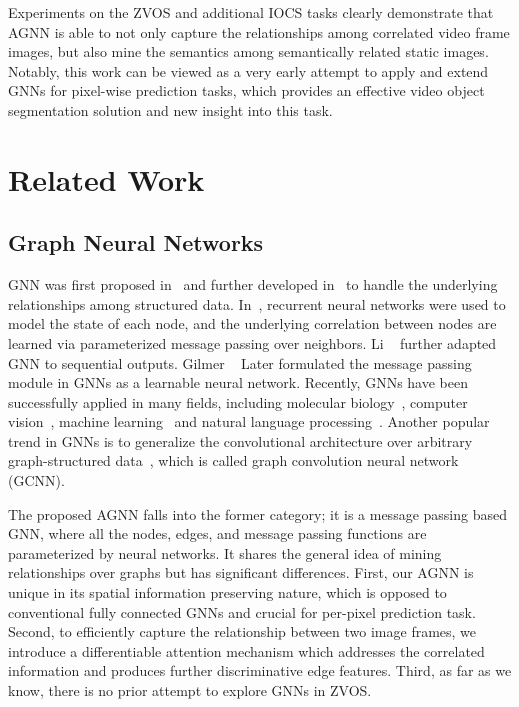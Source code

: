 \documentclass[10pt,twocolumn,letterpaper]{article}
\begin{document}
Experiments on the ZVOS and additional IOCS tasks clearly demonstrate that AGNN is able to not only capture the relationships among correlated video frame images, but also mine the semantics among semantically related static images. Notably, this work can be viewed as a very early attempt to apply and extend GNNs for pixel-wise prediction tasks, which provides an effective video object segmentation solution and new insight into this task. \vspace*{-5pt}
\section{Related Work}
	\vspace*{-4pt}	
\subsection{Graph Neural Networks}
	\vspace*{-4pt}	
\label{sec:gnn}
GNN was first proposed in~\cite{gori2005new} and further developed in~\cite{scarselli2009graph} to handle the underlying relationships among structured data. In~\cite{scarselli2009graph}, recurrent neural networks were used to model the state of each node, and the underlying correlation between nodes are learned via parameterized message passing over neighbors. Li \etal~\cite{li2015gated} further adapted GNN to sequential outputs. Gilmer \etal~\cite{gilmer2017neural} Later formulated the message passing module in GNNs as a learnable neural network. Recently, GNNs have been successfully applied in many fields, including molecular biology~\cite{gilmer2017neural}, computer vision~\cite{Qi_2018_ECCV,Wang_2018_ECCV,zheng2019reasoning}, machine learning~\cite{velickovic2017graph} and natural language processing~\cite{beck2018graph}. Another popular trend in GNNs is to generalize the convolutional architecture over arbitrary graph-structured data~\cite{duvenaud2015convolutional,niepert2016learning,kipf2016semi}, which is called graph convolution neural network (GCNN). 



The proposed AGNN falls into the former category; it is a message passing based GNN, where all the nodes, edges, and message passing functions are parameterized by neural networks. It shares the general
idea of mining relationships over graphs but has significant
differences. First, our AGNN is unique in its spatial information preserving nature, which is opposed to conventional fully connected GNNs and crucial for per-pixel prediction task. Second, to efficiently capture the relationship between two image frames, we introduce a  differentiable attention mechanism which addresses the correlated information and produces further discriminative edge features. Third, as far as we know, there is no prior attempt to explore GNNs in ZVOS.
	\vspace*{-3pt}
\end{document}
